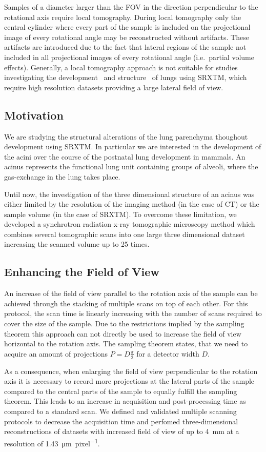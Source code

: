 Samples of a diameter larger than the FOV in the direction perpendicular to the rotational axis require local tomography. During local tomography only the central cylinder where every part of the sample is included on the projectional image of every rotational angle may be reconstructed without artifacts. These artifacts are introduced due to the fact that lateral regions of the sample not included in all projectional images of every rotational angle (i.e.\ partial volume effects). Generally, a local tomography approach is not suitable for studies investigating the development~\cite{Schittny2008,Mund2008} and structure~\cite{Tsuda2008} of lungs using SRXTM, which require high resolution datasets providing a large lateral field of view.

\subsection{Motivation}%
We are studying the structural alterations of the lung parenchyma thoughout  development using SRXTM. In particular we are interested in the development of the acini over the course of the postnatal lung development in mammals. An acinus represents the functional lung unit containing groups of alveoli, where the gas-exchange in the lung takes place.

Until now, the investigation of the three dimensional structure of an acinus was either limited by the resolution of the imaging method (in the case of \micro CT) or the sample volume (in the case of SRXTM). To overcome these limitation, we developed a synchrotron radiation x-ray tomographic microscopy method which combines several tomographic scans into one large three dimensional dataset increasing the scanned volume up to 25 times.

\subsection{Enhancing the Field of View}%
\label{subsec:enhancing the field of view}%
An increase of the field of view parallel to the rotation axis of the sample can be achieved through the stacking of multiple scans on top of each other. For this protocol, the scan time is linearly increasing with the number of scans required to cover the size of the sample. Due to the restrictions implied by the sampling theorem this approach can not directly be used to increase the field of view horizontal to the rotation axis. The sampling theorem states, that we need to acquire an amount of projections $P=D\frac{\pi}{2}$ for a detector width $D$.

As a consequence, when enlarging the field of view perpendicular to the rotation axis it is necessary to record more projections at the lateral parts of the sample compared to the central parts of the sample to equally fulfill the sampling theorem. This leads to an increase in acquisition and post-processing time as compared to a standard scan. We defined and validated multiple scanning protocols to decrease the acquisition time and perfomed three-dimensional reconstructions of datasets with increased field of view of up to \SI{4}{\milli\meter} at a resolution of \SI{1.43}{\micro\meter\per pixel}.